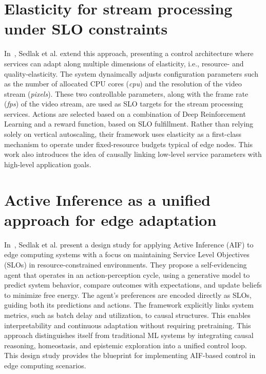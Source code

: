 \section{Elasticity for stream processing under SLO constraints}
In~\cite{sedlak_towards_2025}, Sedlak et al. extend this approach, presenting a control architecture where services can adapt along multiple dimensions of elasticity, i.e., resource- and quality-elasticity. The system dynaimcally adjusts configuration parameters such as the number of allocated CPU cores (\textit{cpu}) and the resolution of the video stream (\textit{pixels}). These two controllable parameters, along with the frame rate (\textit{fps}) of the video stream, are used as SLO targets for the stream processing services. Actions are selected based on a combination of Deep Reinforcement Learning and a reward function, based on SLO fulfillment. Rather than relying solely on vertical autoscaling, their framework uses elasticity as a first-class mechanism to operate under fixed-resource budgets typical of edge nodes. This work also introduces the idea of causally linking low-level service parameters with high-level application goals.

\section{Active Inference as a unified approach for edge adaptation}
In~\cite{sedlak_active_2024}, Sedlak et al. present a design study for applying Active Inference (AIF) to edge computing systems with a focus on maintaining Service Level Objectives (SLOs) in resource-constrained environments. They propose a self-evidencing agent that operates in an action-perception cycle, using a generative model to predict system behavior, compare outcomes with expectations, and update beliefs to minimize free energy. The agent’s preferences are encoded directly as SLOs, guiding both its predictions and actions. The framework explicitly links system metrics, such as batch delay and utilization, to causal structures. This enables interpretability and continuous adaptation without requiring pretraining. This approach distinguishes itself from traditional ML systems by integrating causal reasoning, homeostasis, and epistemic exploration into a unified control loop. This design study provides the blueprint for implementing AIF-based control in edge computing scenarios.

